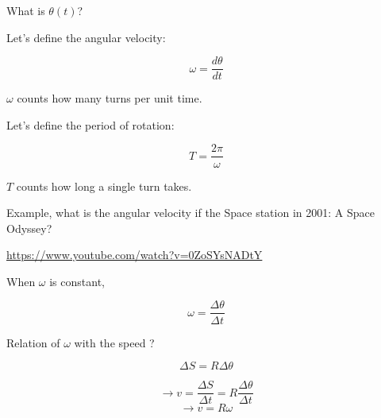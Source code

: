 \documentclass[]{beamer}
\begin{document}
 \begin{frame}
What is $\theta(t)$?

\pause
\vspace{3mm}

Let's define the angular velocity:


\begin{equation}
    \boxed{\omega=\frac{d \theta}{dt}}
\end{equation}

$\omega$ counts how many turns per unit time.
\vspace{3mm}

\pause
Let's define the period of rotation:

\begin{equation}
    \boxed{T=\frac{2\pi}{\omega}}
\end{equation}

$T$ counts how long a single turn takes.
\end{frame}




 \begin{frame}
  Example, what is the angular velocity if the Space station in 
  2001: A Space Odyssey?

  \vspace{5mm}

  \url{https://www.youtube.com/watch?v=0ZoSYsNADtY}

    \end{frame}



 \begin{frame}
    When $\omega$ is constant,


 
    
    
    \begin{equation}
        \boxed{\omega=\frac{\Delta \theta}{\Delta t}}
    \end{equation}
\pause

    Relation of $\omega$ with the speed ?

\begin{equation*}
    \Delta S=R\Delta\theta 
\end{equation*}

\pause
\begin{equation*}
   \rightarrow  v=\frac{\Delta S}{\Delta t}= R\frac{\Delta\theta}{\Delta t}
\end{equation*}
\pause
\begin{equation*}
    \rightarrow  v= R\omega
 \end{equation*}
    
    \end{frame}
\end{document}
